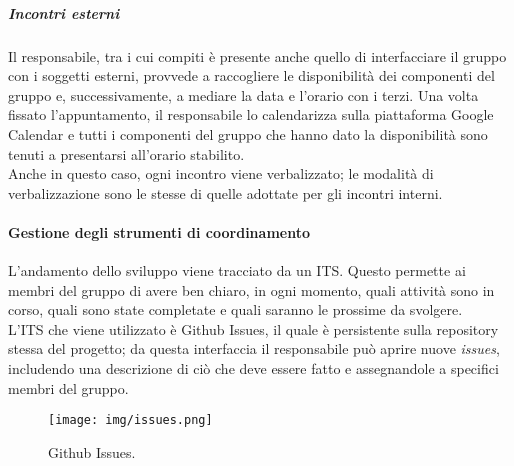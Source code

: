 \subparagraph{Incontri esterni}
Il responsabile, tra i cui compiti è presente anche quello di interfacciare il gruppo con i soggetti esterni, provvede a raccogliere le disponibilità dei componenti del gruppo e, successivamente, a mediare la data e l'orario con i terzi. Una volta fissato l'appuntamento, il responsabile lo calendarizza sulla piattaforma Google Calendar e tutti i componenti del gruppo che hanno dato la disponibilità sono tenuti a presentarsi all'orario stabilito. \\
Anche in questo caso, ogni incontro viene verbalizzato; le modalità di verbalizzazione sono le stesse di quelle adottate per gli incontri interni.

\paragraph{Gestione degli strumenti di coordinamento}
L'andamento dello sviluppo viene tracciato da un ITS. Questo permette ai membri del gruppo di avere ben chiaro, in ogni momento, quali attività sono in corso, quali sono state completate e quali saranno le prossime da svolgere. \\
L'ITS che viene utilizzato è Github Issues, il quale è persistente sulla repository stessa del progetto; da questa interfaccia il responsabile può aprire nuove \textit{issues}, includendo una descrizione di ciò che deve essere fatto e assegnandole a specifici membri del gruppo.

\begin{figure}[H]
  \centering
  \texttt{[image: img/issues.png]}
  \label{fig:sheets}
  \caption{Github Issues.}
\end{figure}

